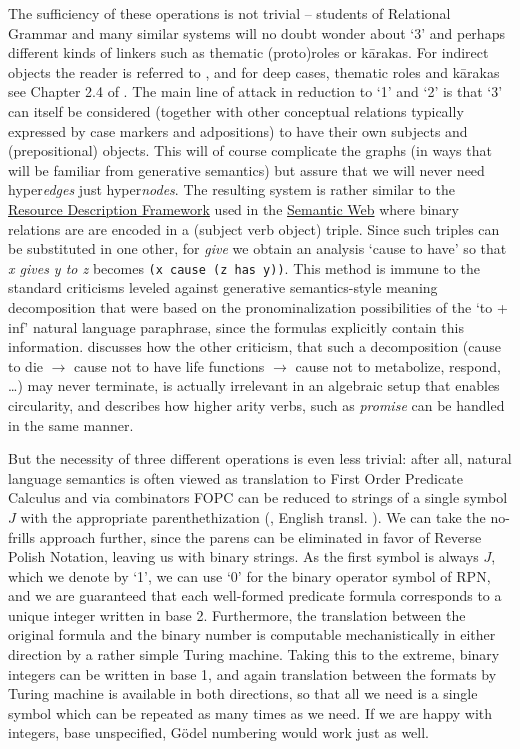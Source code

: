 \documentclass[output=paper,colorlinks=true,citecolor=brown]{langscibook}
\begin{document}
The sufficiency of these operations is not trivial -- students of Relational
Grammar and many similar systems will no doubt wonder about `3' and perhaps
different kinds of linkers such as thematic (proto)roles or k\={a}rakas. For
indirect objects the reader is referred to \citet{Kornai:2012}, and for deep
cases, thematic roles and k\={a}rakas see Chapter 2.4 of \citet{Kornai:2022}.
The main line of attack in reduction to `1' and `2' is that `3' can itself be
considered (together with other conceptual relations typically expressed by
case markers and adpositions) to have their own subjects and (prepositional)
objects. This will of course complicate the graphs (in ways that will be
familiar from generative semantics) but assure that we will never need
hyper\emph{edges} just hyper\emph{nodes}. The resulting system is rather similar
to the
\href{https://en.wikipedia.org/wiki/Resource_Description_Framework}{Resource
  Description Framework} used in the
\href{https://en.wikipedia.org/wiki/Semantic_Web}{Semantic Web} where binary
relations are are encoded in a (subject verb object) triple. Since such
triples can be substituted in one other, for \emph{give} we obtain an analysis
`cause to have' so that \emph{x gives y to z} becomes \texttt{(x cause (z has
  y))}. This method is immune to the standard criticisms \citep{Fodor:1970}
leveled against generative semantics-style meaning decomposition that were
based on the pronominalization possibilities of the `to + inf' natural
language paraphrase, since the formulas explicitly contain this information.
\citet{Kornai:2010} discusses how the other criticism, that such a
decomposition (cause to die $\rightarrow$ cause not to have life functions
$\rightarrow$ cause not to metabolize, respond, \ldots) may never terminate,
is actually irrelevant in an algebraic setup that enables circularity, and
\citet{Kornai:2012} describes how higher arity verbs, such as \emph{promise} can
be handled in the same manner. 

But the necessity of three different operations is even less trivial: after all,
natural language semantics is often viewed as translation to First Order
Predicate Calculus \citep{Blackburn:2015} and via combinators
\citep{Curry:1958} FOPC can be reduced to strings of a single symbol $J$ with
the appropriate parenthethization (\cite{Schoenfinkel:1924}, English
transl. \cite{Heijenoort:1967}). We can take the no-frills approach further,
since the parens can be eliminated in favor of Reverse Polish Notation,
leaving us with binary strings. As the first symbol is always $J$, which we
denote by `1', we can use `0' for the binary operator symbol of RPN, and we
are guaranteed that each well-formed predicate formula corresponds to a unique
integer written in base 2. Furthermore, the translation between the original
formula and the binary number is computable mechanistically in either
direction by a rather simple Turing machine. Taking this to the extreme,
binary integers can be written in base 1, and again translation between the
formats by Turing machine is available in both directions, so that all we need
is a single symbol which can be repeated as many times as we need. If we are
happy with integers, base unspecified, Gödel numbering would work just as
well.
\end{document}

